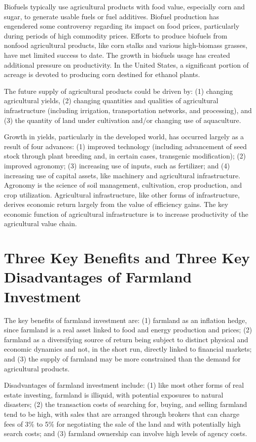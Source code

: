 \documentclass[11pt]{article}
\begin{document}
Biofuels typically use agricultural products with food value, especially corn and sugar, to generate usable fuels or fuel additives. Biofuel production has engendered some controversy regarding its impact on food prices, particularly during periods of high commodity prices. Efforts to produce biofuels from nonfood agricultural products, like corn stalks and various high-biomass grasses, have met limited success to date. The growth in biofuels usage has created additional pressure on productivity. In the United States, a significant portion of acreage is devoted to producing corn destined for ethanol plants.

The future supply of agricultural products could be driven by: (1) changing agricultural yields, (2) changing quantities and qualities of agricultural infrastructure (including irrigation, transportation networks, and processing), and (3) the quantity of land under cultivation and/or changing use of aquaculture.

Growth in yields, particularly in the developed world, has occurred largely as a result of four advances: (1) improved technology (including advancement of seed stock through plant breeding and, in certain cases, transgenic modification); (2) improved agronomy; (3) increasing use of inputs, such as fertilizer; and (4) increasing use of capital assets, like machinery and agricultural infrastructure. Agronomy is the science of soil management, cultivation, crop production, and crop utilization. Agricultural infrastructure, like other forms of infrastructure, derives economic return largely from the value of efficiency gains. The key economic function of agricultural infrastructure is to increase productivity of the agricultural value chain.

\section*{Three Key Benefits and Three Key Disadvantages of Farmland Investment}
The key benefits of farmland investment are: (1) farmland as an inflation hedge, since farmland is a real asset linked to food and energy production and prices; (2) farmland as a diversifying source of return being subject to distinct physical and economic dynamics and not, in the short run, directly linked to financial markets; and (3) the supply of farmland may be more constrained than the demand for agricultural products.

Disadvantages of farmland investment include: (1) like most other forms of real estate investing, farmland is illiquid, with potential exposures to natural disasters; (2) the transaction costs of searching for, buying, and selling farmland tend to be high, with sales that are arranged through brokers that can charge fees of 3\% to 5\% for negotiating the sale of the land and with potentially high search costs; and (3) farmland ownership can involve high levels of agency costs.
\end{document}

